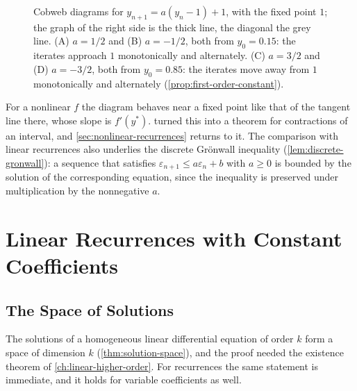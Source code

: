 \begin{figure}
{}
\caption{Cobweb diagrams for $y_{n+1}=a(y_n-1)+1$, with the fixed point $1$; the graph of the right side is the thick line, the diagonal the grey line. (A) $a=1/2$ and (B) $a=-1/2$, both from $y_0=0.15$: the iterates approach $1$ monotonically and alternately. (C) $a=3/2$ and (D) $a=-3/2$, both from $y_0=0.85$: the iterates move away from $1$ monotonically and alternately (\cref{prop:first-order-constant}).\label{fig:cobweb-linear}}
\end{figure}

For a nonlinear $f$ the diagram behaves near a fixed point like that of the tangent line there, whose slope is $f'(y^*)$.  turned this into a theorem for contractions of an interval, and \cref{sec:nonlinear-recurrences} returns to it. The comparison with linear recurrences also underlies the discrete Gr\"onwall inequality (\cref{lem:discrete-gronwall}): a sequence that satisfies $\varepsilon_{n+1}\le a\varepsilon_n+b$ with $a\ge0$ is bounded by the solution of the corresponding equation, since the inequality is preserved under multiplication by the nonnegative $a$.

\section{Linear Recurrences with Constant Coefficients}
\label{sec:constant-coefficient-recurrences}

\subsection{The Space of Solutions}

The solutions of a homogeneous linear differential equation of order $k$ form a space of dimension $k$ (\cref{thm:solution-space}), and the proof needed the existence theorem of \cref{ch:linear-higher-order}. For recurrences the same statement is immediate, and it holds for variable coefficients as well.

